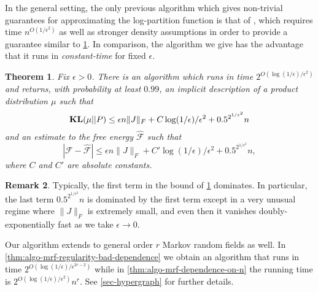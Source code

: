 \documentclass[final, 12pt]{colt2018}
\newcommand{\bE}{\mathbb{E}}
\newcommand{\E}{\bE}      %
\newcommand{\KL}{\mathop{\bf KL\/}}
\newcommand{\fnote}[1]{\textcolor{blue}{\small {\textbf{(Fred: }#1\textbf{) }}}}
\newtheorem{theorem}{Theorem}[section]
\theoremstyle{definition}
\newtheorem{remark}[theorem]{Remark}
\theoremstyle{plain}
\begin{document}
In the general setting, the only previous algorithm which gives non-trivial guarantees for approximating the log-partition function is that of \citep{risteski-ising}, which requires time $n^{O(1/\epsilon^2)}$ as well as stronger density assumptions in order to provide a  guarantee similar to \cref{thm:regularity-alg}. In comparison, the algorithm we give has the advantage that it runs in \emph{constant-time} for fixed $\epsilon$.
\begin{theorem}\label{thm:regularity-alg}
Fix $\epsilon > 0$. There is an algorithm which runs in time $2^{O(\log(1/\epsilon)/\epsilon^2)}$ and
returns, with probability at least $0.99$, an implicit description of a product distribution $\mu$
such that
\[ \KL(\mu || P) \le \epsilon n \|J\|_F  + C\log(1/\epsilon)/\epsilon^2 + 0.5^{2^{1/\epsilon^2}} n \]
and an estimate to the free energy $\hat{\mathcal{F}}$ such that
\[ |\mathcal{F} - \hat{\mathcal{F}}| \le \epsilon n \|J\|_F  + C'\log(1/\epsilon)/\epsilon^2 + 0.5^{2^{1/\epsilon^2}} n, \]
where $C$ and $C'$ are absolute constants. 
\end{theorem}
\begin{remark}
Typically, the first term in the bound of \cref{thm:regularity-alg} dominates. In particular, the last term $0.5^{2^{1/\epsilon^2}} n$ is dominated by the first term except in a very unusual regime where $\|J\|_F$ is extremely small,
and even then it vanishes doubly-exponentially fast as we take $\epsilon \to 0$.
\end{remark}


Our algorithm extends to general order $r$ Markov random fields as well. In \cref{thm:algo-mrf-regularity-bad-dependence} we obtain an algorithm that runs in time $2^{O(\log(1/\epsilon)/\epsilon^{2r-2})}$ while in
\cref{thm:algo-mrf-dependence-on-n} the running time is $2^{O(\log(1/\epsilon)/\epsilon^2)}n^{r}$.
See \cref{sec-hypergraph} for further details.
\end{document}

